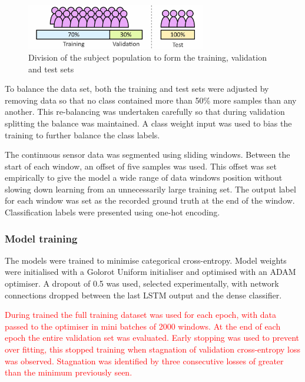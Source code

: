 \documentclass[sensors,article,submit,moreauthors,pdftex]{Definitions/mdpi}
\begin{document}
\begin{figure}[!hbt]
    \centering
    \includegraphics[width=0.7\textwidth]{Figures/test_train_split.jpg}
    \caption{Division of the subject population to form the training, validation and test sets}
    \label{fig:test_training_split}
\end{figure}

To balance the data set, both the training and test sets were adjusted by removing data so that no class contained more than 50\% more samples than any another. This re-balancing was undertaken carefully so that during validation splitting the balance was maintained. A class weight input was used to bias the training to further balance the class labels.

The continuous sensor data was segmented using sliding windows. Between the start of each window, an offset of five samples was used. This offset was set empirically to give the model a wide range of data windows position without slowing down learning from an unnecessarily large training set. The output label for each window was set as the recorded ground truth at the end of the window. Classification labels were presented using one-hot encoding.

\subsubsection{Model training}
The models were trained to minimise categorical cross-entropy. Model weights were initialised with a Golorot Uniform initialiser\cite{Glorot2010} and optimised with an ADAM optimiser\cite{Kingma2015}. A dropout of 0.5 was used, selected experimentally, with network connections dropped between the last LSTM output and the dense classifier.

\textcolor{red}{During trained the full training dataset was used for each epoch, with data passed to the optimiser in mini batches of 2000 windows. At the end of each epoch the entire validation set was evaluated. Early stopping was used to prevent over fitting, this stopped training when stagnation of validation cross-entropy loss was observed. Stagnation was identified by three consecutive losses of greater than the minimum previously seen.}
\end{document}
